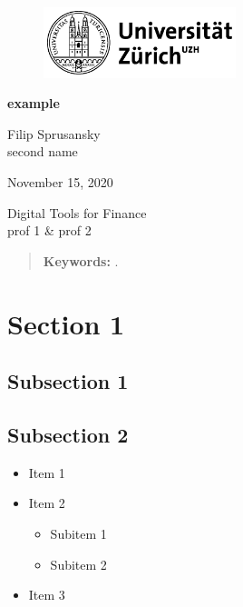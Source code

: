 \documentclass[a4paper,12pt]{article}
\begin{document}
	
	\begin{titlepage}
		\centering
		\begin{figure}[!h]
			\centering
			\includegraphics[width=0.5\textwidth]{UZH}
		\end{figure}
		\Large{\textbf{example}\\}

		
		\vfill 
		
		\large{Filip Sprusansky \\ 
				second name \\}
		
		\vfill
			
		\large{November 15, 2020}
		
		\vfill
		\vfill
	
		\large{Digital Tools for Finance \\prof 1 \& prof 2 \\ }
	
		\vfill
		\begin{abstract}
		\noindent
			\blindtext
			
			\vspace{3mm}
			
			\textbf{Keywords:} .
		\end{abstract}
		
		
	\end{titlepage}
	
	
	\clearpage
	\tableofcontents
	
	\clearpage
	\listoffigures
	
	\clearpage
	\listoftables
	\clearpage	
	
	\section{Section 1}
	\subsection{Subsection 1}
    \blindtext
    \subsection{Subsection 2}
    \blindtext
    \begin{itemize}
    	\item Item 1
    	\item Item 2
    	\begin{itemize}
    		\item Subitem 1
    		\item Subitem 2
    	\end{itemize}
    	\item Item 3
    \end{itemize}
\end{document}
